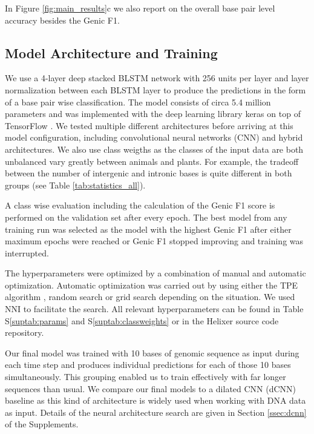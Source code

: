 \documentclass{bioinfo}
\newcounter{suptab}
\begin{document}
\begin{methods}
In Figure \ref{fig:main_results}c we also report on the overall base pair level 
accuracy besides the Genic F1.

\subsection{Model Architecture and Training}
\label{sec:model}
We use a 4-layer deep stacked BLSTM network with 256 units per layer and layer 
normalization \citep{ba2016layer} between each BLSTM layer to produce the 
predictions in the form of a base pair wise classification. The model consists of 
circa 5.4 million parameters and was implemented with the deep learning library 
keras \citep{chollet2015keras} on top of TensorFlow \citep{abadi2016tensorflow}. We 
tested multiple different architectures before arriving at this model configuration, 
including convolutional neural networks (CNN) and hybrid architectures. We also use 
class weigths as the classes of the input data are both unbalanced vary greatly 
between animals and plants. 
For example, the tradeoff between the number of intergenic and intronic bases is 
quite different in both groups (see Table \ref{tab:statistics_all}). 

A class wise evaluation including the calculation of the Genic 
F1 score is performed on the validation set after every epoch. The best model
from any training run was selected as the model with the highest Genic F1 after either
maximum epochs were reached or Genic F1 stopped improving and training was interrupted.

The hyperparameters were optimized by a combination of manual and automatic 
optimization. Automatic optimization was carried out by using either the TPE 
algorithm \citep{bergstra2011algorithms}, random search or grid search depending on 
the situation. We used NNI \citep{nni2019} to facilitate the search. All relevant 
hyperparameters can be found in Table S\ref{suptab:params} and 
S\ref{suptab:classweights} or in the Helixer source code repository. 
	
Our final model was trained with 10 bases of genomic sequence as input during each 
time step and produces individual predictions for each of those 10 bases 
simultaneously. This grouping enabled us to train effectively with far longer 
sequences than usual. 
We compare our final models to a dilated CNN (dCNN) baseline as this kind of architecture is 
widely used when working with DNA data as input. Details of the neural architecture 
search are given in Section \ref{ssec:dcnn} of the Supplements.


\end{methods}
\end{document}
